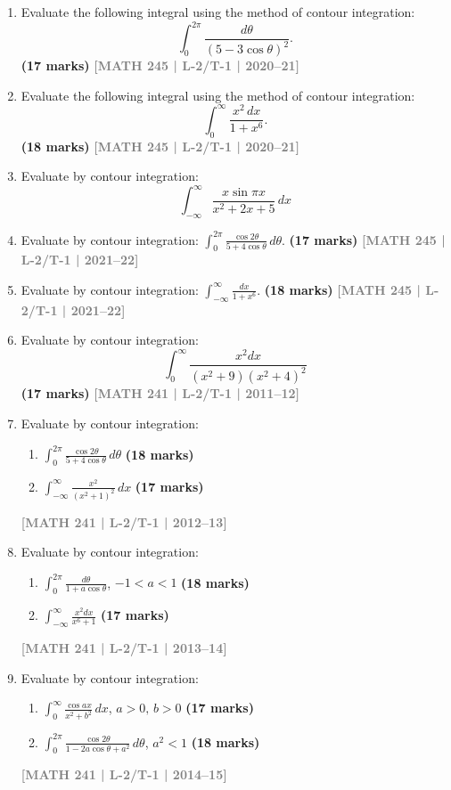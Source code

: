 \documentclass[12pt,a4paper]{article}
\newcommand{\yr}[1]{\hfill\textcolor{gray}{\small\textbf{[#1]}}}
\newcommand{\mk}[1]{\textcolor{orange!70!black}{\small\textbf{(#1 marks)}}}
\begin{document}
\begin{enumerate}

\item Evaluate the following integral using the method of contour integration:
\[
\int_{0}^{2\pi} \frac{d\theta}{(5-3\cos\theta)^{2}}.
\]
\mk{17} \yr{MATH 245 | L-2/T-1 | 2020--21}

\item Evaluate the following integral using the method of contour integration:
\[
\int_{0}^{\infty} \frac{x^{2}\,dx}{1+x^{6}}.
\]
\mk{18} \yr{MATH 245 | L-2/T-1 | 2020--21}

\item Evaluate by contour integration:
\[
\int_{-\infty}^{\infty} \frac{x\sin\pi x}{x^{2}+2x+5}\,dx 
\]

\item Evaluate by contour integration: $\displaystyle\int_{0}^{2\pi}\frac{\cos 2\theta}{5+4\cos\theta}\,d\theta$.
\mk{17} \yr{MATH 245 | L-2/T-1 | 2021--22}

\item Evaluate by contour integration: $\displaystyle\int_{-\infty}^{\infty}\frac{dx}{1+x^{6}}$.
\mk{18} \yr{MATH 245 | L-2/T-1 | 2021--22} 

\item Evaluate by contour integration:
\[
\int_{0}^{\infty} \frac{x^2 dx}{(x^2 + 9)(x^2 + 4)^2}
\]
\mk{17} \yr{MATH 241 | L-2/T-1 | 2011--12}

\item Evaluate by contour integration:
\begin{enumerate}
  \item $\displaystyle\int_{0}^{2\pi} \frac{\cos 2\theta}{5+4\cos\theta}\,d\theta$ \mk{18}
  \item $\displaystyle\int_{-\infty}^{\infty} \frac{x^{2}}{{(x^{2}+1)}^{2}}\,dx$ \mk{17}
\end{enumerate}
\yr{MATH 241 | L-2/T-1 | 2012--13}

\item Evaluate by contour integration:
\begin{enumerate}
  \item $\displaystyle\int_{0}^{2\pi} \frac{d\theta}{1+a\cos\theta}$, \quad $-1<a<1$ \mk{18}
  \item $\displaystyle\int_{-\infty}^{\infty} \frac{x^{2}dx}{x^{6}+1}$ \mk{17}
\end{enumerate}
\yr{MATH 241 | L-2/T-1 | 2013--14}

\item Evaluate by contour integration:
\begin{enumerate}
  \item $\displaystyle\int_{0}^{\infty}\frac{\cos ax}{x^{2}+b^{2}}\,dx$, \quad $a>0,\,b>0$ \mk{17}
  \item $\displaystyle\int_{0}^{2\pi}\frac{\cos 2\theta}{1-2a\cos\theta+a^{2}}\,d\theta$, \quad $a^{2}<1$ \mk{18}
\end{enumerate}
\yr{MATH 241 | L-2/T-1 | 2014--15}


\end{enumerate}
\end{document}

